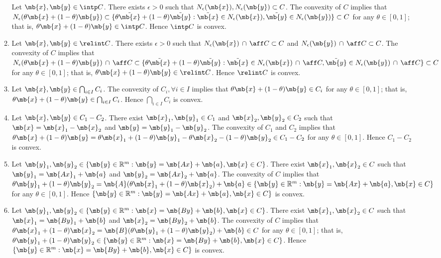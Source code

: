 \begin{exercise}
\begin{enumerate}
\begin{solution}
\begin{enumerate}
            Let $\mb{x}, \mb{y} \in \intp C$. There exists $\epsilon>0$ such that $N_\epsilon(\mb{x}), N_\epsilon(\mb{y}) \subset C$. The convexity of $C$ implies that $N_\epsilon(\theta \mb{x} + (1-\theta) \mb{y}) \subset \{\theta \tilde{\mb{x}} + (1-\theta) \tilde{\mb{y}} : \tilde{\mb{x}} \in N_\epsilon(\mb{x}), \tilde{\mb{y}} \in N_\epsilon(\mb{y}) \} \subset C$ for any $\theta \in [0,1]$; that is, $\theta \mb{x} + (1-\theta) \mb{y} \in \intp C$. Hence $\intp C$ is convex.
          \item Let $\mb{x}, \mb{y} \in \relint C$. There exists $\epsilon>0$ such that $N_\epsilon(\mb{x})\,\cap\,\aff C \subset C$ and $N_\epsilon(\mb{y})\,\cap\,\aff C \subset C$. The convexity of $C$ implies that $N_\epsilon(\theta \mb{x} + (1-\theta) \mb{y})\,\cap\,\aff C \subset \{\theta \tilde{\mb{x}} + (1-\theta) \tilde{\mb{y}} : \tilde{\mb{x}} \in N_\epsilon(\mb{x})\,\cap\,\aff C, \tilde{\mb{y}} \in N_\epsilon(\mb{y})\,\cap\,\aff C \} \subset C$ for any $\theta \in [0,1]$; that is, $\theta \mb{x} + (1-\theta) \mb{y} \in \relint C$. Hence $\relint C$ is convex.
          \item Let $\mb{x}, \mb{y} \in \bigcap_{i \in I}C_i$. The convexity of $C_i, \forall i\in I$ implies that $\theta \mb{x} + (1-\theta) \mb{y}\in C_i$ for any $\theta \in [0,1]$; that is, $\theta \mb{x} + (1-\theta) \mb{y} \in \bigcap_{i \in I}C_i$. Hence $\bigcap_{i \in I}C_i$ is convex.
          \item Let $\mb{x}, \mb{y} \in C_1 - C_2$. There exist $\mb{x}_1, \mb{y}_1 \in C_1$ and $\mb{x}_2, \mb{y}_2 \in C_2$ such that $\mb{x} = \mb{x}_1 - \mb{x}_2$ and $\mb{y} = \mb{y}_1 - \mb{y}_2$. The convexity of $C_1$ and $C_2$ implies that $\theta \mb{x} + (1-\theta) \mb{y} = \theta \mb{x}_1 + (1-\theta) \mb{y}_1 - \theta \mb{x}_2 - (1-\theta) \mb{y}_2 \in C_1 - C_2$ for any $\theta \in [0,1]$. Hence $C_1 - C_2$ is convex.
          \item Let $\mb{y}_1, \mb{y}_2 \in \{ \mb{y}\in\mathbb{R}^m:\mb{y}=\mb{Ax}+\mb{a},\mb{x}\in C \}$. There exist $\mb{x}_1, \mb{x}_2 \in C$ such that $\mb{y}_1=\mb{Ax}_1+\mb{a}$ and $\mb{y}_2=\mb{Ax}_2+\mb{a}$. The convexity of $C$ implies that $\theta \mb{y}_1 + (1-\theta) \mb{y}_2 = \mb{A}(\theta \mb{x}_1 + (1-\theta) \mb{x}_2) + \mb{a} \in \{ \mb{y}\in\mathbb{R}^m:\mb{y}=\mb{Ax}+\mb{a},\mb{x}\in C \}$ for any $\theta \in [0,1]$. Hence $\{ \mb{y}\in\mathbb{R}^m:\mb{y}=\mb{Ax}+\mb{a},\mb{x}\in C \}$ is convex.
          \item Let $\mb{y}_1, \mb{y}_2 \in \{ \mb{y}\in\mathbb{R}^m:\mb{x}=\mb{By}+\mb{b},\mb{x}\in C \}$. There exist $\mb{x}_1, \mb{x}_2 \in C$ such that $\mb{x}_1=\mb{By}_1+\mb{b}$ and $\mb{x}_2=\mb{By}_2+\mb{b}$. The convexity of $C$ implies that $\theta \mb{x}_1 + (1-\theta) \mb{x}_2 = \mb{B}(\theta \mb{y}_1 + (1-\theta) \mb{y}_2) + \mb{b} \in C$ for any $\theta \in [0,1]$; that is, $\theta \mb{y}_1 + (1-\theta) \mb{y}_2 \in \{ \mb{y}\in\mathbb{R}^m:\mb{x}=\mb{By}+\mb{b},\mb{x}\in C \}$. Hence $\{ \mb{y}\in\mathbb{R}^m:\mb{x}=\mb{By}+\mb{b},\mb{x}\in C \}$ is convex.
            \qedhere
        \end{enumerate}
      \end{solution}


\end{enumerate}
\end{exercise}
